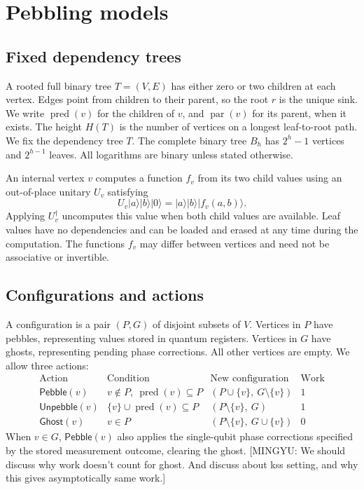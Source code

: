 \documentclass[11pt]{article}
\theoremstyle{definition}
\theoremstyle{remark}
\DeclareMathOperator{\pred}{pred}
\DeclareMathOperator{\parv}{par}
\newcommand{\Peb}{\mathsf{Pebble}}
\newcommand{\ket}[1]{\lvert#1\rangle}
\newcommand{\Unp}{\mathsf{Unpebble}}
\newcommand{\Ghost}{\mathsf{Ghost}}
\newcommand{\mingyu}[1]{{\color{magenta}\footnotesize [MINGYU: #1]}} %
\begin{document}
\section{Pebbling models}
\label{sec:models}

\subsection{Fixed dependency trees}

A rooted full binary tree $T=(V,E)$ has either zero or two children at each vertex. Edges point from children to their parent, so the root $r$ is the unique sink. We write $\pred(v)$ for the children of $v$, and $\parv(v)$ for its parent, when it exists. The height $H(T)$ is the number of vertices on a longest leaf-to-root path. We fix the dependency tree $T$. The complete binary tree $B_h$ has
$2^h-1$ vertices and $2^{h-1}$ leaves.
All logarithms are binary unless stated otherwise.

An internal vertex $v$ computes a function $f_v$ from its two child values using an out-of-place unitary $U_v$ satisfying
\[
U_v\ket{a}\ket{b}\ket{0}=\ket{a}\ket{b}\ket{f_v(a,b)}.
\]
Applying $U_v^\dagger$ uncomputes this value when both child values are available. Leaf values have no dependencies and can be loaded and erased at any time during the computation. The functions $f_v$ may differ between vertices and need not be associative or invertible.

\subsection{Configurations and actions}

A configuration is a pair $(P,G)$ of disjoint subsets of $V$. Vertices in $P$ have pebbles, representing values stored in quantum registers. Vertices in $G$ have ghosts, representing pending phase corrections. All other vertices are empty. We allow three actions:
\[
\begin{array}{lllc}
\text{Action} & \text{Condition} & \text{New configuration} & \text{Work} \\[3pt]
\Peb(v) & v\notin P,\ \pred(v)\subseteq P & (P\cup\{v\},\ G\setminus\{v\}) & 1 \\[3pt]
\Unp(v) & \{v\}\cup\pred(v)\subseteq P & (P\setminus\{v\},\ G) & 1 \\[3pt]
\Ghost(v) & v\in P & (P\setminus\{v\},\ G\cup\{v\}) & 0
\end{array}
\]
When $v\in G$, $\Peb(v)$ also applies the single-qubit phase corrections specified by the stored measurement outcome, clearing the ghost. \mingyu{We should discuss why work doesn't count for ghost. And discuss about kss setting, and why this gives asymptotically same work.}
\end{document}
